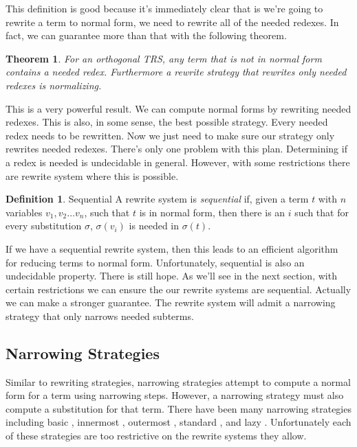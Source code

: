 \documentclass{article}
\newtheorem{theorem}{Theorem}
\theoremstyle{definition}
\newtheorem{definition}{Definition}[section]
\begin{document}
This definition is good because it's immediately clear that is we're going
to rewrite a term to normal form, we need to rewrite all of the needed redexes.
In fact, we can guarantee more than that with the following theorem.

\begin{theorem}
    For an orthogonal TRS, any term that is not in normal form contains a needed redex.
    Furthermore a rewrite strategy that rewrites only needed redexes is normalizing.
\end{theorem}

This is a very powerful result.
We can compute normal forms by rewriting needed redexes.
This is also, in some sense, the best possible strategy.
Every needed redex needs to be rewritten.
Now we just need to make sure our strategy only rewrites needed redexes.
There's only one problem with this plan.
Determining if a redex is needed is undecidable in general.
However, with some restrictions there are rewrite system where this is possible.

\theoremstyle{definition}
\begin{definition}{Sequential}
    A rewrite system is \textit{sequential} if, given a term $t$ with $n$ variables $v_1,v_2\ldots v_n$,
    such that $t$ is in normal form,
    then there is an $i$ such that for every substitution $\sigma$, $\sigma(v_i)$ is needed in $\sigma(t)$.
\end{definition}

If we have a sequential rewrite system,
then this leads to an efficient algorithm for reducing terms to normal form.
Unfortunately, sequential is also an undecidable property.
There is still hope.
As we'll see in the next section,
with certain restrictions we can ensure the our rewrite systems are sequential.
Actually we can make a stronger guarantee.
The rewrite system will admit a narrowing strategy that only narrows needed subterms.

\subsection{Narrowing Strategies}

Similar to rewriting strategies, narrowing strategies attempt to compute a normal form
for a term using narrowing steps.
However, a narrowing strategy must also compute a substitution for that term.
There have been many narrowing strategies including basic \cite{basicNarrowing},
innermost \cite{innermostNarrowing}, outermost \cite{outermostNarrowing},
standard \cite{standardNarrowing}, and lazy \cite{lazyNarrowing}.
Unfortunately each of these strategies are too restrictive on the rewrite systems they allow.
\end{document}
